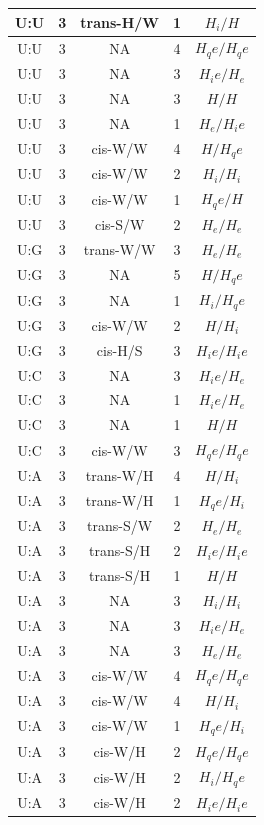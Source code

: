 \begin{center}
\begin{longtable}{c|c|c|c|c}
U:U & 3 & trans-H/W & 1 & $H_i/H$ \\  \hline
U:U & 3 & NA & 4 & $H_qe/H_qe$ \\  \hline
U:U & 3 & NA & 3 & $H_ie/H_e$ \\  \hline
U:U & 3 & NA & 3 & $H/H$ \\  \hline
U:U & 3 & NA & 1 & $H_e/H_ie$ \\  \hline
U:U & 3 & cis-W/W & 4 & $H/H_qe$ \\  \hline
U:U & 3 & cis-W/W & 2 & $H_i/H_i$ \\  \hline
U:U & 3 & cis-W/W & 1 & $H_qe/H$ \\  \hline
U:U & 3 & cis-S/W & 2 & $H_e/H_e$ \\  \hline
U:G & 3 & trans-W/W & 3 & $H_e/H_e$ \\  \hline
U:G & 3 & NA & 5 & $H/H_qe$ \\  \hline
U:G & 3 & NA & 1 & $H_i/H_qe$ \\  \hline
U:G & 3 & cis-W/W & 2 & $H/H_i$ \\  \hline
U:G & 3 & cis-H/S & 3 & $H_ie/H_ie$ \\  \hline
U:C & 3 & NA & 3 & $H_ie/H_e$ \\  \hline
U:C & 3 & NA & 1 & $H_ie/H_e$ \\  \hline
U:C & 3 & NA & 1 & $H/H$ \\  \hline
U:C & 3 & cis-W/W & 3 & $H_qe/H_qe$ \\  \hline
U:A & 3 & trans-W/H & 4 & $H/H_i$ \\  \hline
U:A & 3 & trans-W/H & 1 & $H_qe/H_i$ \\  \hline
U:A & 3 & trans-S/W & 2 & $H_e/H_e$ \\  \hline
U:A & 3 & trans-S/H & 2 & $H_ie/H_ie$ \\  \hline
U:A & 3 & trans-S/H & 1 & $H/H$ \\  \hline
U:A & 3 & NA & 3 & $H_i/H_i$ \\  \hline
U:A & 3 & NA & 3 & $H_ie/H_e$ \\  \hline
U:A & 3 & NA & 3 & $H_e/H_e$ \\  \hline
U:A & 3 & cis-W/W & 4 & $H_qe/H_qe$ \\  \hline
U:A & 3 & cis-W/W & 4 & $H/H_i$ \\  \hline
U:A & 3 & cis-W/W & 1 & $H_qe/H_i$ \\  \hline
U:A & 3 & cis-W/H & 2 & $H_qe/H_qe$ \\  \hline
U:A & 3 & cis-W/H & 2 & $H_i/H_qe$ \\  \hline
U:A & 3 & cis-W/H & 2 & $H_ie/H_ie$ \\  \hline

\end{longtable}
\end{center}
